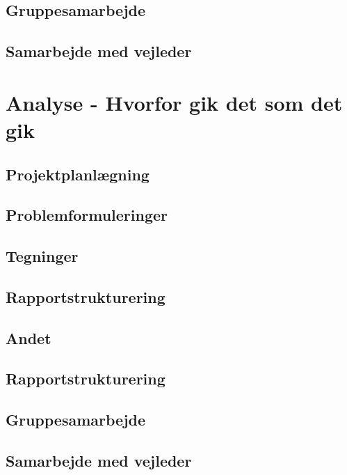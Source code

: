 \documentclass[a4paper,12pt,oneside]{article}
\begin{document}
\subsection{Gruppesamarbejde} 

\subsection{Samarbejde med vejleder}



\section{Analyse - Hvorfor gik det som det gik}

\subsection{Projektplanlægning}

\subsection{Problemformuleringer}

\subsection{Tegninger}

\subsection{Rapportstrukturering}

\subsection{Andet}

\subsection{Rapportstrukturering}

\subsection{Gruppesamarbejde} 

\subsection{Samarbejde med vejleder}
\end{document}
